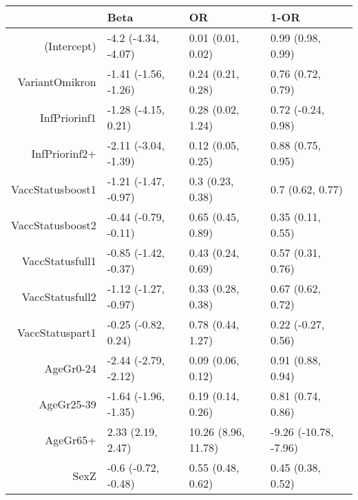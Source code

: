 \begin{table}[ht]
\centering
\begin{tabular}{rlll}
  \hline
 & Beta & OR & 1-OR \\ 
  \hline
(Intercept) & -4.2 (-4.34, -4.07) & 0.01 (0.01, 0.02) & 0.99 (0.98, 0.99) \\ 
  VariantOmikron & -1.41 (-1.56, -1.26) & 0.24 (0.21, 0.28) & 0.76 (0.72, 0.79) \\ 
  InfPriorinf1 & -1.28 (-4.15, 0.21) & 0.28 (0.02, 1.24) & 0.72 (-0.24, 0.98) \\ 
  InfPriorinf2+ & -2.11 (-3.04, -1.39) & 0.12 (0.05, 0.25) & 0.88 (0.75, 0.95) \\ 
  VaccStatusboost1 & -1.21 (-1.47, -0.97) & 0.3 (0.23, 0.38) & 0.7 (0.62, 0.77) \\ 
  VaccStatusboost2 & -0.44 (-0.79, -0.11) & 0.65 (0.45, 0.89) & 0.35 (0.11, 0.55) \\ 
  VaccStatusfull1 & -0.85 (-1.42, -0.37) & 0.43 (0.24, 0.69) & 0.57 (0.31, 0.76) \\ 
  VaccStatusfull2 & -1.12 (-1.27, -0.97) & 0.33 (0.28, 0.38) & 0.67 (0.62, 0.72) \\ 
  VaccStatuspart1 & -0.25 (-0.82, 0.24) & 0.78 (0.44, 1.27) & 0.22 (-0.27, 0.56) \\ 
  AgeGr0-24 & -2.44 (-2.79, -2.12) & 0.09 (0.06, 0.12) & 0.91 (0.88, 0.94) \\ 
  AgeGr25-39 & -1.64 (-1.96, -1.35) & 0.19 (0.14, 0.26) & 0.81 (0.74, 0.86) \\ 
  AgeGr65+ & 2.33 (2.19, 2.47) & 10.26 (8.96, 11.78) & -9.26 (-10.78, -7.96) \\ 
  SexZ & -0.6 (-0.72, -0.48) & 0.55 (0.48, 0.62) & 0.45 (0.38, 0.52) \\ 
   \hline
\end{tabular}
\end{table}
